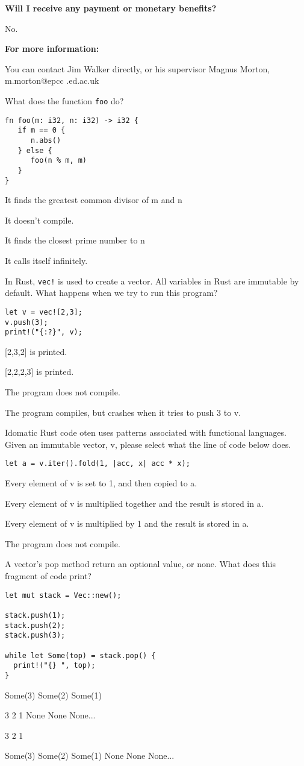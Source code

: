 \documentclass[11pt]{article} %
\newcommand*\choice{\item}
\begin{document}
\noindent\textbf{Will I receive any payment or monetary benefits?}

\noindent No.

\noindent\textbf{For more information:}

\noindent You can contact Jim Walker directly, or his supervisor Magnus Morton, m.morton@epcc .ed.ac.uk
\pagebreak

\begin{multiplechoice}[choices=1]
What does the function \texttt{foo} do?
\begin{lstlisting}
fn foo(m: i32, n: i32) -> i32 {
   if m == 0 {
      n.abs()
   } else {
      foo(n % m, m)
   }
}
\end{lstlisting}
  \choice It finds the greatest common divisor of m and n
  \choice It doesn't compile.
  \choice It finds the closest prime number to n
  \choice It calls itself infinitely.
\end{multiplechoice}

\begin{multiplechoice}[choices=1]
In Rust, \texttt{vec!} is used to create a vector. All variables in Rust are immutable by default. What happens when we try to run this program?
\begin{lstlisting}
let v = vec![2,3];
v.push(3);
print!("{:?}", v);
\end{lstlisting}

\choice {[2,3,2]} is printed.
\choice {[2,2,2,3]} is printed.
\choice The program does not compile.
\choice The program compiles, but crashes when it tries to push 3 to v.

\end{multiplechoice}


\begin{multiplechoice}[choices=1]
Idomatic Rust code oten uses patterns associated with functional languages. Given an immutable vector, v, please select what the line of code below does.
\begin{lstlisting}
let a = v.iter().fold(1, |acc, x| acc * x);
\end{lstlisting}
  \choice Every element of v is set to 1, and then copied to a.
  \choice Every element of v is multiplied together and the result is stored in a.
  \choice Every element of v is multiplied by 1 and the result is stored in a.
  \choice The program does not compile.
\end{multiplechoice}

\begin{multiplechoice}[choices=1]
A vector's pop method return an optional value, or none. What does this fragment of code print?
\begin{lstlisting}
let mut stack = Vec::new();

stack.push(1);
stack.push(2);
stack.push(3);

while let Some(top) = stack.pop() {
  print!("{} ", top);
}
\end{lstlisting}
  \choice Some(3) Some(2) Some(1)
  \choice 3 2 1 None None None...
  \choice 3 2 1
  \choice Some(3) Some(2) Some(1) None None None...
\end{multiplechoice}
\end{document}
